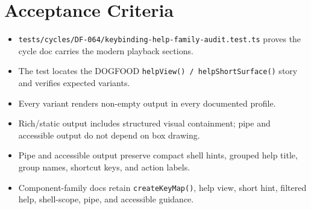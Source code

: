 \section{Acceptance Criteria}\label{record-105-acceptance-criteria}

\begin{itemize}
\tightlist
\item
  \texttt{t\allowbreak{}e\allowbreak{}s\allowbreak{}t\allowbreak{}s\allowbreak{}/\allowbreak{}c\allowbreak{}y\allowbreak{}c\allowbreak{}l\allowbreak{}e\allowbreak{}s\allowbreak{}/\allowbreak{}D\allowbreak{}F\allowbreak{}-\allowbreak{}0\allowbreak{}6\allowbreak{}4\allowbreak{}/\allowbreak{}k\allowbreak{}e\allowbreak{}y\allowbreak{}b\allowbreak{}i\allowbreak{}n\allowbreak{}d\allowbreak{}i\allowbreak{}n\allowbreak{}g\allowbreak{}-\allowbreak{}h\allowbreak{}e\allowbreak{}l\allowbreak{}p\allowbreak{}-\allowbreak{}f\allowbreak{}a\allowbreak{}m\allowbreak{}i\allowbreak{}l\allowbreak{}y\allowbreak{}-\allowbreak{}a\allowbreak{}u\allowbreak{}d\allowbreak{}i\allowbreak{}t\allowbreak{}.\allowbreak{}t\allowbreak{}e\allowbreak{}s\allowbreak{}t\allowbreak{}.\allowbreak{}t\allowbreak{}s} proves the cycle doc carries the modern playback sections.
\item
  The test locates the DOGFOOD \texttt{h\allowbreak{}e\allowbreak{}l\allowbreak{}p\allowbreak{}V\allowbreak{}i\allowbreak{}e\allowbreak{}w\allowbreak{}(\allowbreak{})\allowbreak{} \allowbreak{}/\allowbreak{} \allowbreak{}h\allowbreak{}e\allowbreak{}l\allowbreak{}p\allowbreak{}S\allowbreak{}h\allowbreak{}o\allowbreak{}r\allowbreak{}t\allowbreak{}S\allowbreak{}u\allowbreak{}r\allowbreak{}f\allowbreak{}a\allowbreak{}c\allowbreak{}e\allowbreak{}(\allowbreak{})} story and verifies expected variants.
\item
  Every variant renders non-empty output in every documented profile.
\item
  Rich/static output includes structured visual containment; pipe and accessible output do not depend on box drawing.
\item
  Pipe and accessible output preserve compact shell hints, grouped help title, group names, shortcut keys, and action labels.
\item
  Component-family docs retain \texttt{c\allowbreak{}r\allowbreak{}e\allowbreak{}a\allowbreak{}t\allowbreak{}e\allowbreak{}K\allowbreak{}e\allowbreak{}y\allowbreak{}M\allowbreak{}a\allowbreak{}p\allowbreak{}(\allowbreak{})}, help view, short hint, filtered help, shell-scope, pipe, and accessible guidance.
\end{itemize}

